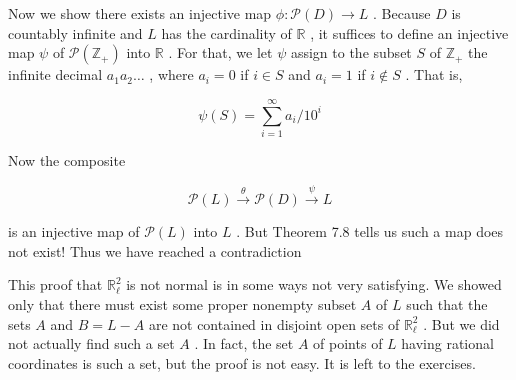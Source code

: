 Now we show there exists an injective map \(\phi  : \mathcal{P}\left( D\right)  \rightarrow  L\) . Because \(D\) is countably infinite and \(L\) has the cardinality of \(\mathbb{R}\) , it suffices to define an injective map \(\psi\) of \(\mathcal{P}\left( {\mathbb{Z}}_{ + }\right)\) into \(\mathbb{R}\) . For that, we let \(\psi\) assign to the subset \(S\) of \({\mathbb{Z}}_{ + }\) the infinite decimal \({a}_{1}{a}_{2}\ldots\) , where \({a}_{i} = 0\) if \(i \in  S\) and \({a}_{i} = 1\) if \(i \notin  S\) . That is,

\[
\psi \left( S\right)  = \mathop{\sum }\limits_{{i = 1}}^{\infty }{a}_{i}/{10}^{i}
\]

Now the composite

\[
\mathcal{P}\left( L\right) \overset{\theta }{ \rightarrow  }\mathcal{P}\left( D\right) \overset{\psi }{ \rightarrow  }L
\]

is an injective map of \(\mathcal{P}\left( L\right)\) into \(L\) . But Theorem 7.8 tells us such a map does not exist! Thus we have reached a contradiction

This proof that \({\mathbb{R}}_{\ell }^{2}\) is not normal is in some ways not very satisfying. We showed only that there must exist some proper nonempty subset \(A\) of \(L\) such that the sets \(A\) and \(B = L - A\) are not contained in disjoint open sets of \({\mathbb{R}}_{\ell }^{2}\) . But we did not actually find such a set \(A\) . In fact, the set \(A\) of points of \(L\) having rational coordinates is such a set, but the proof is not easy. It is left to the exercises.

